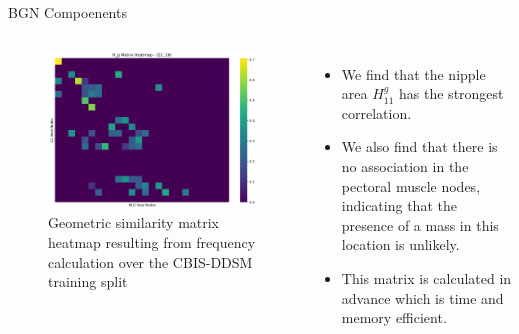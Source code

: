 \documentclass[8pt,aspectratio=169,xcolor=dvipsnames]{beamer}
\begin{document}
\begin{frame}{BGN Compoenents}
\begin{columns}
            \begin{figure}
        \centering
        \includegraphics[width=0.9\linewidth]{hg_matrix_heatmap.png}
        \caption{Geometric similarity matrix heatmap resulting from frequency calculation over the CBIS-DDSM training split}
        \label{fig:hg_matrix_heatmap}
    \end{figure}
        
        \begin{itemize}
     \item We find that the nipple area $H^g_{11}$ has the strongest correlation.
     \item We also find that there is no association in the pectoral muscle nodes, indicating that the presence of a mass in this location is unlikely.
     \item This matrix is calculated in advance which is time and memory efficient.
 \end{itemize}
    \end{columns}

\end{frame}
 
\end{document}

